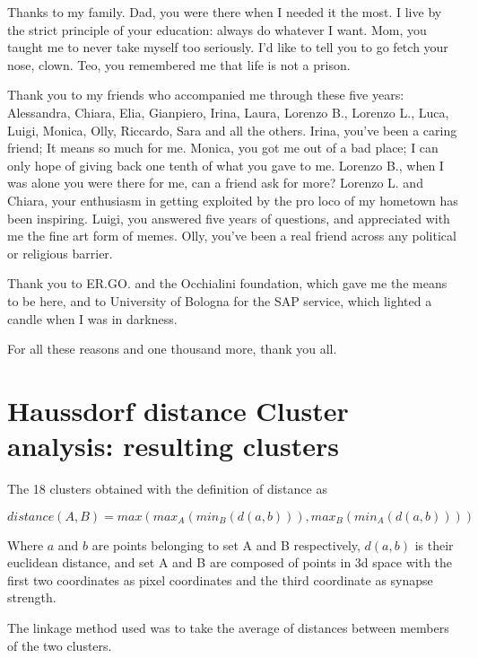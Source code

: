 \documentclass[a4paper]{report}
\begin{document}
Thanks to my family.
Dad, you were there when I needed it the most.
I live by the strict principle of your education:
always do whatever I want.
Mom, you taught me to never take myself too seriously.
I'd like to tell you to go fetch your nose, clown.
Teo, you remembered me that life is not a prison.

Thank you to my friends who accompanied me through these five years:
Alessandra, Chiara, Elia, Gianpiero, Irina, Laura, Lorenzo B., Lorenzo L., Luca, Luigi, Monica, Olly, Riccardo, Sara and all the others.
Irina, you've been a caring friend;
It means so much for me.
Monica, you got me out of a bad place;
I can only hope of giving back one tenth of what you gave to me.
Lorenzo B., when I was alone you were there for me, can a friend ask for more?
Lorenzo L. and Chiara, your enthusiasm in getting exploited by the pro loco of my hometown has been inspiring.
Luigi, you answered five years of questions, and appreciated with me the fine art form of memes.
Olly, you've been a real friend across any political or religious barrier.

Thank you to ER.GO. and the Occhialini foundation, which gave me the means to be here, and to University of Bologna for the SAP service, which lighted a candle when I was in darkness.

For all these reasons and one thousand more, thank you all.



\appendix

\chapter{Haussdorf distance Cluster analysis: resulting clusters}

The 18 clusters obtained with the definition of distance as

\begin{equation}
    distance(A, B) = max(max_A(min_B(d(a,b))), max_B(min_A(d(a,b))))
\end{equation}

Where $a$ and $b$ are points belonging to set A and B respectively, $d(a,b)$ is their euclidean distance, and set A and B are composed of points in 3d space with the first two coordinates as pixel coordinates and the third coordinate as synapse strength.

The linkage method used was to take the average of distances between members of the two clusters.
\end{document}
